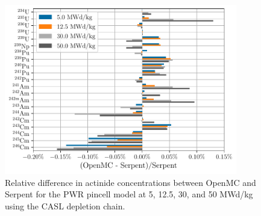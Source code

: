 \documentclass[3p,authoryear]{elsarticle}
\begin{document}
\begin{figure}[H]
  \centering
  \includegraphics[width=4in]{figures/pwr_actinides_casl.pdf}
  \caption{Relative difference in actinide concentrations between OpenMC and
  Serpent for the PWR pincell model at 5, 12.5, 30, and 50 MWd/kg using the CASL
  depletion chain.}
  \label{fig:pwr-actinides-casl}
\end{figure}
\end{document}
